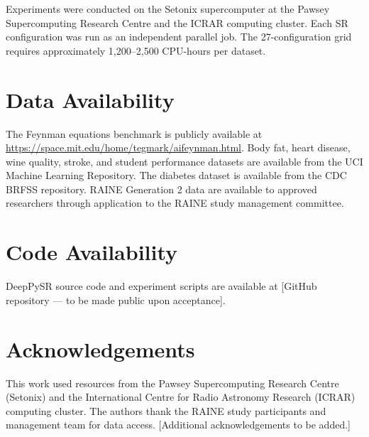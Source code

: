 \documentclass[10pt,twocolumn]{article}
\begin{document}
Experiments were conducted on the Setonix supercomputer at the Pawsey
Supercomputing Research Centre and the ICRAR computing cluster.  Each SR
configuration was run as an independent parallel job.  The 27-configuration
grid requires approximately 1,200–2,500 CPU-hours per dataset.

\section*{Data Availability}

The Feynman equations benchmark is publicly available at
\url{https://space.mit.edu/home/tegmark/aifeynman.html}.
Body fat, heart disease, wine quality, stroke, and student performance
datasets are available from the UCI Machine Learning Repository.
The diabetes dataset is available from the CDC BRFSS repository.
RAINE Generation 2 data are available to approved researchers through
application to the RAINE study management committee.

\section*{Code Availability}

DeepPySR source code and experiment scripts are available at
[GitHub repository — to be made public upon acceptance].

\section*{Acknowledgements}

This work used resources from the Pawsey Supercomputing Research Centre
(Setonix) and the International Centre for Radio Astronomy Research (ICRAR)
computing cluster.  The authors thank the RAINE study participants and
management team for data access.
[Additional acknowledgements to be added.]
\end{document}
